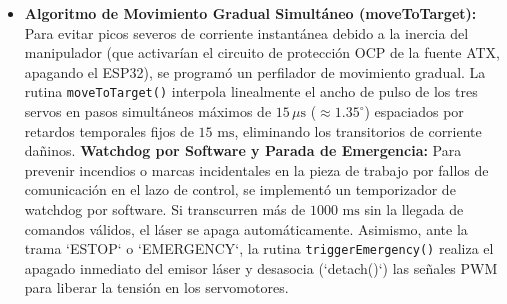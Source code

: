 \documentclass[conference,a4paper]{IEEEtran}
\begin{document}
\begin{itemize}
        \begin{equation}
        t_{\mu\text{s}} = 1500 + \theta \cdot \frac{2000}{\pi}
        \end{equation}
        clampando el resultado estrictamente en la banda de seguridad de $[500, 2500]\,\mu\text{s}$.
    \item \textbf{Algoritmo de Movimiento Gradual Simultáneo (moveToTarget):} Para evitar picos severos de corriente instantánea debido a la inercia del manipulador (que activarían el circuito de protección OCP de la fuente ATX, apagando el ESP32), se programó un perfilador de movimiento gradual. La rutina \texttt{moveToTarget()} interpola linealmente el ancho de pulso de los tres servos en pasos simultáneos máximos de $15\,\mu\text{s}$ ($\approx 1.35^\circ$) espaciados por retardos temporales fijos de $15\text{ ms}$, eliminando los transitorios de corriente dañinos.
    \textbf{Watchdog por Software y Parada de Emergencia:} Para prevenir incendios o marcas incidentales en la pieza de trabajo por fallos de comunicación en el lazo de control, se implementó un temporizador de watchdog por software. Si transcurren más de $1000\text{ ms}$ sin la llegada de comandos válidos, el láser se apaga automáticamente. Asimismo, ante la trama `ESTOP` o `EMERGENCY`, la rutina \texttt{triggerEmergency()} realiza el apagado inmediato del emisor láser y desasocia (`detach()`) las señales PWM para liberar la tensión en los servomotores.
\end{itemize}
\end{document}
